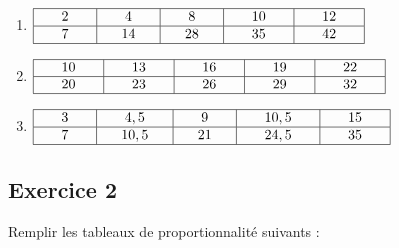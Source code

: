\documentclass[12 pt]{extarticle}
\theoremstyle{plain}
\begin{document}
\begin{enumerate}
\item $
\begin{array}{|c|c|c|c|c|}
\hline
\phantom{000}     2   \phantom{000} 
& \phantom{000}    4   \phantom{000} 
& \phantom{000}    8   \phantom{000} 
& \phantom{000}    10 \phantom{000} 
& \phantom{000}   12    \phantom{000}\\
\hline
 7 & 14  &28 & 35 & 42 \\
\hline
\end{array}$

\item $
\begin{array}{|c|c|c|c|c|}
\hline
\phantom{000}    10    \phantom{000} 
& \phantom{000}    13   \phantom{000} 
& \phantom{000}      16 \phantom{000} 
& \phantom{000}      19 \phantom{000} 
& 
\phantom{000}
22
\phantom{000}\\
\hline

20 & 23 & 26& 29&32 \\
\hline
\end{array}$

\item $
\begin{array}{|c|c|c|c|c|}
\hline
\phantom{000}     3   \phantom{000} 
& \phantom{000}    4,5   \phantom{000} 
& \phantom{000}     9  \phantom{000} 
& \phantom{000}      10,5 \phantom{000} 
& 
\phantom{000}
15
\phantom{000}\\
\hline

 7& 10,5 &21 &24,5 & 35\\
\hline
\end{array}$
\end{enumerate}

\subsection*{Exercice 2} 

Remplir les tableaux de proportionnalité suivants : 
\end{document}

